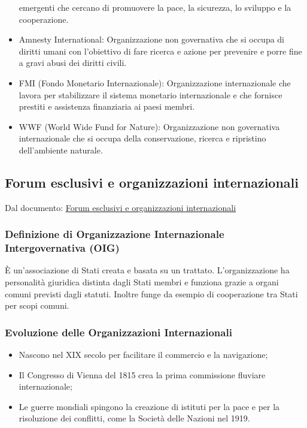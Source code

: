 \documentclass{article}
\begin{document}
\begin{itemize}
        emergenti che cercano di promuovere la pace, la sicurezza, lo sviluppo e la
        cooperazione.
    \item Amnesty International: Organizzazione non governativa che si occupa di diritti umani
        con l'obiettivo di fare ricerca e azione per prevenire e porre fine a gravi abusi dei
        diritti civili.
    \item FMI (Fondo Monetario Internazionale): Organizzazione internazionale che lavora per
        stabilizzare il sistema monetario internazionale e che fornisce prestiti e assistenza
        finanziaria ai paesi membri.
    \item WWF (World Wide Fund for Nature): Organizzazione non governativa internazionale che
        si occupa della conservazione, ricerca e ripristino dell'ambiente naturale.
\end{itemize}

\newpage
\subsection{Forum esclusivi e organizzazioni internazionali}
Dal documento: \href{https://github.com/matteofrongillo/passerella/blob/main/Geografia/media/061_Materiale OLE_Pass 06f OrganizzazioniEForum 23-24 schede_Pass_06f_OrganizzazioniEFo.pdf?raw=true}
{Forum esclusivi e organizzazioni internazionali}

\subsubsection{Definizione di Organizzazione Internazionale Intergovernativa (OIG)}
È un'associazione di Stati creata e basata su un trattato. L'organizzazione ha personalità
giuridica distinta dagli Stati membri e funziona grazie a organi comuni previsti dagli statuti.
Inoltre funge da esempio di cooperazione tra Stati per scopi comuni.

\subsubsection{Evoluzione delle Organizzazioni Internazionali}
\begin{itemize}
    \item Nascono nel XIX secolo per facilitare il commercio e la navigazione;
    \item Il Congresso di Vienna del 1815 crea la prima commissione fluviare internazionale;
    \item Le guerre mondiali spingono la creazione di istituti per la pace e per la risoluzione
        dei conflitti, come la Società delle Nazioni nel 1919.
\end{itemize}
\end{document}
